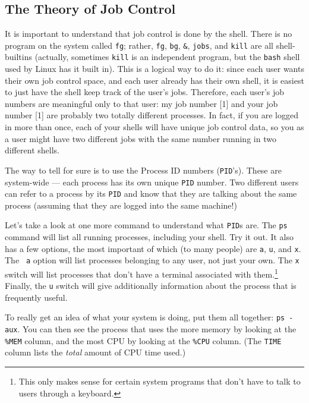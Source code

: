 \subsection{The Theory of Job Control}

        It is important to understand that job control is done by the
shell.  There is no program on the system called {\tt fg}; rather,
{\tt fg}, {\tt bg}, {\tt \&}, {\tt jobs}, and {\tt kill} are all
shell-builtins (actually, sometimes {\tt kill} is an independent
program, but the {\tt bash} shell used by Linux has it built in).
This is a logical way to do it: since each user wants their own job
control space, and each user already has their own shell, it is
easiest to just have the shell keep track of the user's jobs.
Therefore, each user's job numbers are meaningful only to that user:
my job number [1] and your job number [1] are probably two totally
different processes.  In fact, if you are logged in more than once,
each of your shells will have unique job control data, so you as a
user might have two different jobs with the same number running in two
different shells.

        The way to tell for sure is to use the Process ID numbers
({\tt PID}'s).  These are system-wide --- each process has its own
unique {\tt PID} number.  Two different users can refer to a process
by its {\tt PID} and know that they are talking about the same process
(assuming that they are logged into the same machine!)

Let's take a look at one more command to understand what {\tt PID}s
are. The {\tt ps} command will list all running processes, including
your shell. Try it out. It also has a few options, the most important
of which (to many people) are {\tt a}, {\tt u}, and {\tt x}.  The {\tt
  a} option will list processes belonging to any user, not just your
own. The {\tt x} switch will list processes that don't have a terminal
associated with them.\footnote{This only makes sense for certain
  system programs that don't have to talk to users through a
  keyboard.} Finally, the {\tt u} switch will give additionally
information about the process that is frequently useful.

To really get an idea of what your system is doing, put them all
together: {\tt ps -aux}. You can then see the process that uses the
more memory by looking at the {\tt \%MEM} column, and the most CPU
by looking at the {\tt \%CPU} column. (The {\tt TIME} column lists the
{\em total\/} amount of CPU time used.) 

